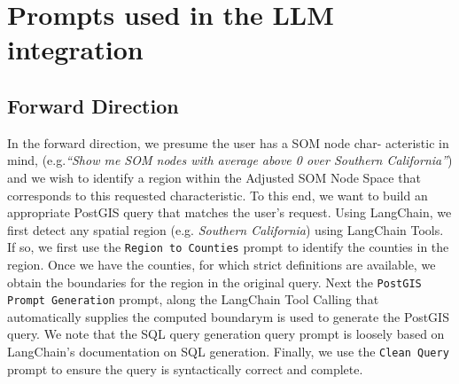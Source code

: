 \section{Prompts used in the LLM integration}
\subsection{Forward Direction}
In the forward direction, we presume the user has a SOM node char- acteristic in mind, (e.g.\textit{``Show me SOM nodes with average above 0 over Southern California''}) and we wish to identify a region within the Adjusted SOM Node Space that corresponds to this requested characteristic.
%
To this end, we want to build an appropriate PostGIS query that matches the user’s request.
%
Using LangChain, we first detect any spatial region (e.g. \textit{Southern California}) using LangChain Tools.
%
If so, we first use the \texttt{Region to Counties} prompt to identify the counties in the region.
%
Once we have the counties, for which strict definitions are available, we obtain the boundaries for the region in the original query.
%
Next the \texttt{PostGIS Prompt Generation} prompt, along the LangChain Tool Calling that automatically supplies the computed boundarym is used to generate the PostGIS query.
%
We note that the SQL query generation query prompt is loosely based on LangChain's documentation on SQL generation\cite{langchainSQL}.
%
Finally, we use the \texttt{Clean Query} prompt to ensure the query is syntactically correct and complete.

